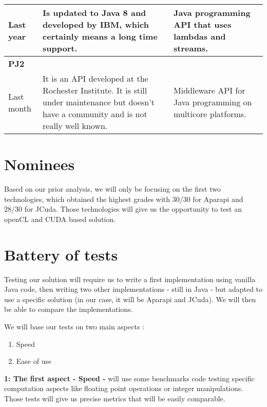 \begin{longtable}{ | p{} | p{} | p{} | }
  \hline

  Last year &
  Is updated to Java 8 and developed by IBM, which certainly means a long time support. &
  Java programming API that uses lambdas and streams. \\
  
  \hline \hline
  
  \multicolumn{3}{|l|}{\textbf{PJ2}} \\

  \hline

  Last month &
  It is an API developed at the Rochester Institute. It is still under maintenance but doesn't have
  a community and is not really well known. &
  Middleware API for Java programming on multicore platforms. \\
  
  \hline

\end{longtable}



\section{Nominees}

Based on our prior analysis, we will only be focusing on the first two technologies, which obtained the highest grades with 30/30 for Aparapi and 28/30 for JCuda. Those technologies will give us the opportunity to test an openCL and CUDA based solution.


\section{Battery of tests} \label{battery test}

Testing our solution will require us to write a first implementation using vanilla Java code, then writing two other implementations - still in Java - but adapted to use a specific solution (in our case, it will be Aparapi and JCuda). We will then be able to compare the implementations.

We will base our tests on two main aspects :

\begin{enumerate}
  \item Speed
  \item Ease of use
\end{enumerate}

\textbf{1: The first aspect - Speed -} will use some benchmarks code testing specific computation aspects like floating point operations or integer manipulations. Those tests will give us precise metrics that will be easily comparable.


